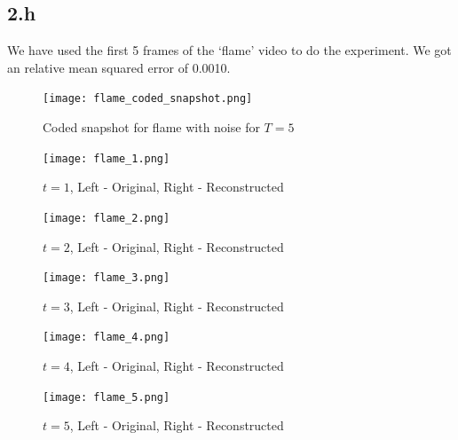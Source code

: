 \documentclass[12pt]{article}
\begin{document}
\subsection*{2.h}
We have used the first 5 frames of the `flame' video to do the experiment. We got an relative mean squared error of 0.0010.
\begin{figure}[ht]
	\centering
	\texttt{[image: flame\_coded\_snapshot.png]}
	\caption{Coded snapshot for flame with noise for $T = 5$}
\end{figure}
\begin{figure}[ht]
	\centering
		\texttt{[image: flame\_1.png]}
		\caption{$t = 1$, Left - Original, Right - Reconstructed}
\end{figure}
\begin{figure}[ht]
	\centering
	\texttt{[image: flame\_2.png]}
	\caption{$t = 2$, Left - Original, Right - Reconstructed}
\end{figure}
\newpage
\begin{figure}[ht]
	\centering
	\texttt{[image: flame\_3.png]}
	\caption{$t = 3$, Left - Original, Right - Reconstructed}
\end{figure}
\begin{figure}[ht]
	\centering
	\texttt{[image: flame\_4.png]}
	\caption{$t = 4$, Left - Original, Right - Reconstructed}
\end{figure}
\begin{figure}[ht]
	\centering
	\texttt{[image: flame\_5.png]}
	\caption{$t = 5$, Left - Original, Right - Reconstructed}
\end{figure}
\newpage
\end{document}
